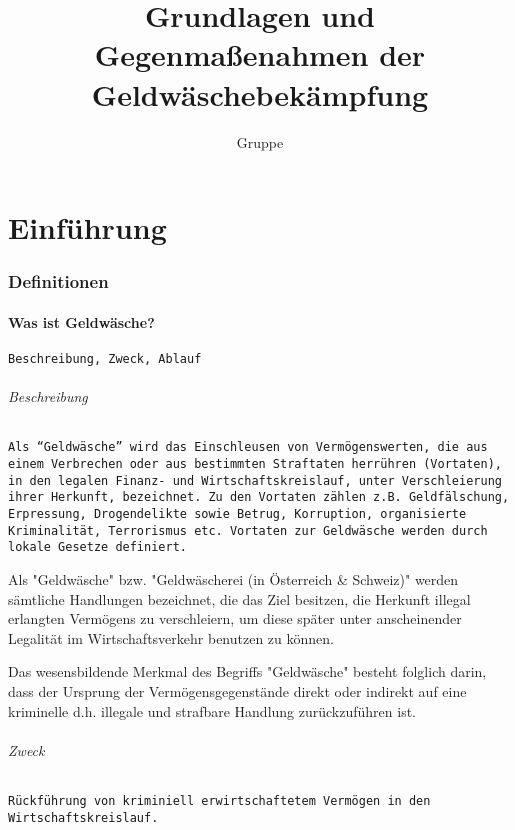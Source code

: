 \documentclass{article}
\begin{document}
\title{Grundlagen und Gegenmaßenahmen der Geldwäschebekämpfung}
\author{Gruppe}
\maketitle

\tableofcontents

\newpage

\part[Einführung]{Einführung}
    \section[Defintionen]{Definitionen}
        \subsection[Was ist Geldwäsche?]{Was ist Geldwäsche?}
            \texttt{Beschreibung, Zweck, Ablauf}
            
            \paragraph[Beschreibung]{Beschreibung}
             	\texttt
                        {Als “Geldwäsche” wird das Einschleusen von Vermögenswerten, die aus einem Verbrechen oder aus bestimmten Straftaten herrühren (Vortaten), in den legalen Finanz- und Wirtschaftskreislauf, unter Verschleierung ihrer Herkunft, bezeichnet. Zu den Vortaten zählen z.B. Geldfälschung, Erpressung, Drogendelikte sowie Betrug, Korruption, organisierte Kriminalität, Terrorismus etc. Vortaten zur Geldwäsche werden durch lokale Gesetze definiert.}   

            		Als "Geldwäsche" bzw. "Geldwäscherei (in Österreich \& Schweiz)" werden sämtliche Handlungen bezeichnet, die das Ziel besitzen, die Herkunft illegal erlangten Vermögens zu verschleiern, um diese später unter anscheinender Legalität im Wirtschaftsverkehr benutzen zu können.

	               	Das wesensbildende Merkmal des Begriffs "Geldwäsche" besteht folglich darin, dass der Ursprung der Vermögensgegenstände direkt oder indirekt auf eine kriminelle d.h. illegale und strafbare Handlung zurückzuführen ist.
            
            \paragraph[Zweck]{Zweck}
            	\texttt
                        {Rückführung von kriminiell erwirtschaftetem Vermögen in den Wirtschaftskreislauf.}
\end{document}
